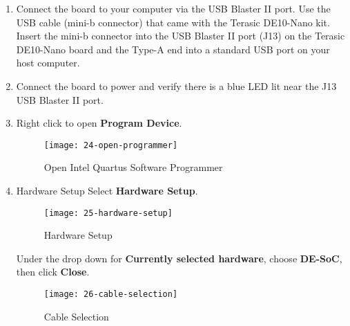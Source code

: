 \begin{flushleft}
\begin{enumerate}[
	label=\textbf{Step \arabic*.},
	leftmargin=*,
	widest={00},
	align=left]
\begin{enumerate}[
	label=\textbf{Step \arabic{enumi}\alph*.},
	leftmargin=*,
	align=left]

\item Connect the board to your computer via the USB Blaster II port. Use the USB cable (mini-b connector) that came with the Terasic DE10-Nano kit. Insert the mini-b connector into the USB Blaster II port (J13) on the Terasic DE10-Nano board and the Type-A end into a standard USB port on your host computer.

\item Connect the board to power and verify there is a blue LED lit near the J13 USB Blaster II port.

\item Right click to open \textbf{Program Device}.

\begin{figure}[H]
\centering
\texttt{[image: 24-open-programmer]}
\caption{Open Intel Quartus Software Programmer}
\label{fig:24-open-programmer}
\end{figure}

\item Hardware Setup
\newline
\newline
Select \textbf{Hardware Setup}.

\begin{figure}[H]
\centering
\texttt{[image: 25-hardware-setup]}
\caption{Hardware Setup}
\label{fig:25-hardware-setup}
\end{figure}

\newpage

Under the drop down for \textbf{Currently selected hardware}, choose \textbf{DE-SoC}, then click \textbf{Close}.

\begin{figure}[H]
\centering
\texttt{[image: 26-cable-selection]}
\caption{Cable Selection}
\label{fig:26-cable-selection}
\end{figure}


\end{enumerate}
\end{enumerate}
\end{flushleft}

